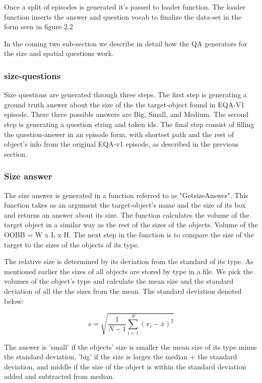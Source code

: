 Once a split of episodes is generated it's passed to loader function. The loader function inserts the answer and question vocab to finalize the data-set in the form seen in figure 2.2

 In the coming two sub-section we describe in detail how the QA generators for the size and spatial questions work. 

\subsubsection{size-questions}

Size questions are generated through three steps. The first step is generating a ground truth answer about the size of the the target-object found in EQA-V1 episode. There three possible answers are  Big, Small, and Medium. The second step is generating a question string and token ids. The final step consist of filling the question-answer in an episode form, with shortest path and the rest of object's info from the original EQA-v1 episode, as described in the previous section. 

\subsubsection{Size answer} 

The size answer is generated in a function referred to as "GetsizeAnswer". This function takes as an argument the target-object's name and the size of its box and returns an answer about its size. The function calculates the volume of the target object in a similar way as the rest of the sizes of the objects. Volume of the OOBB = W x L x H. The next step in the function is to compare the size of the target to the sizes of the objects of its type.

The relative size is determined by its deviation from the standard of its type. As mentioned earlier the sizes of all objects are stored by type in a file. We pick the volumes of the object's type and calculate the mean size and the standard deviation of all the the sizes from the mean. The standard deviation denoted below: 

\[ s = \sqrt{\frac{1}{N-1} \sum_{i=1}^N (x_i - \overline{x})^2} 
\]

The answer is 'small' if the objects' size is smaller the mean size of its type minus the standard deviation,  'big' if the size is larger the median + the standard deviation, and middle if the size of the object is within the standard deviation added and subtracted from median. 

